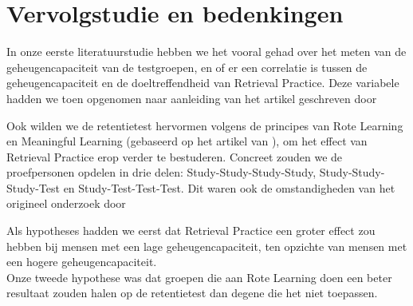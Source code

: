 \documentclass{hogent-article}
\begin{document}
\section{Vervolgstudie en bedenkingen}
In onze eerste literatuurstudie hebben we het vooral gehad over het meten van de geheugencapaciteit van de testgroepen, en of er een correlatie is tussen de geheugencapaciteit en de doeltreffendheid van Retrieval Practice. Deze variabele hadden we toen opgenomen naar aanleiding van het artikel geschreven door \textcite{Agarwal2016}\\
\par
\noindent
Ook wilden we de retentietest hervormen volgens de principes van Rote Learning en Meaningful Learning (gebaseerd op het artikel van \textcite{Mayer2002}), om het effect van Retrieval Practice erop verder te bestuderen.
Concreet zouden we de proefpersonen opdelen in drie delen: Study-Study-Study-Study, Study-Study-Study-Test en Study-Test-Test-Test. Dit waren ook de omstandigheden van het origineel onderzoek door \textcite{Roediger2006} \\
\par
\noindent
Als hypotheses hadden we eerst dat Retrieval Practice een groter effect zou hebben bij mensen met een lage geheugencapaciteit, ten opzichte van mensen met een hogere geheugencapaciteit.  \\
Onze tweede hypothese was dat groepen die aan Rote Learning doen een beter resultaat zouden halen op de retentietest dan degene die het niet toepassen. 



\printbibliography[heading=bibintoc]
\end{document}
